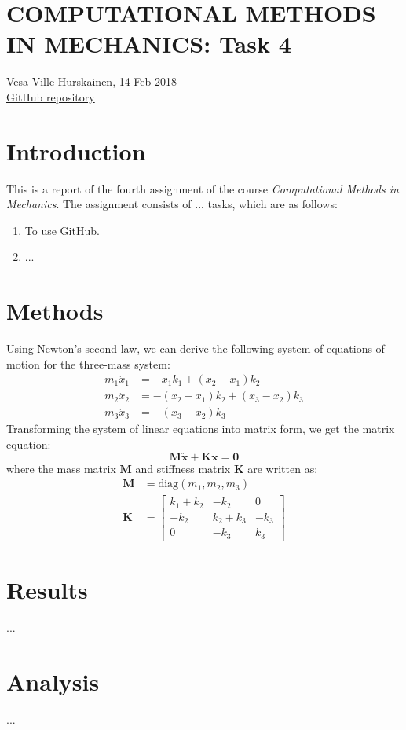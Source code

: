 \documentclass{article}
\begin{document}
	\section*{COMPUTATIONAL METHODS IN MECHANICS: Task 4}
	Vesa-Ville Hurskainen, 14 Feb 2018\\
	\href{https://github.com/VesaVilleHurskainen/cmim2018}{GitHub repository}

	\section*{Introduction}
	This is a report of the fourth assignment of the course \textit{Computational Methods in Mechanics}. The assignment consists of ... tasks, which are as follows:
	
	\begin{enumerate}
		\setlength\itemsep{0pt}
		\item To use GitHub.
		\item ...
	\end{enumerate}

	\section*{Methods}
	Using Newton's second law, we can derive the following system of equations of motion for the three-mass system: 
	\begin{equation}
		\begin{aligned}
		m_1 \ddot{x}_1 & = - x_1 k_1 + (x_2 - x_1) k_2 \\
		m_2 \ddot{x}_2 & = - (x_2 - x_1) k_2 + (x_3 - x_2) k_3\\
		m_3 \ddot{x}_3 & = - (x_3 - x_2) k_3
		\end{aligned}
	\end{equation}
	Transforming the system of linear equations into matrix form, we get the matrix equation:
	\begin{equation}
		\mathbf{M} \ddot{\bm{x}} + \mathbf{K} \bm{x} = \bm{0}
	\end{equation}
	where the mass matrix $\mathbf{M}$ and stiffness matrix $\mathbf{K}$ are written as:
	\begin{align}
		\mathbf{M} &= \text{diag}(m_1, m_2, m_3) \\
		\mathbf{K} &= \begin{bmatrix}
		k_1 + k_2 & -k_2 & 0 \\
		-k_2 & k_2 + k_3 & - k_3 \\
		0 & -k_3 & k_3
		\end{bmatrix}
	\end{align}
	
	\section*{Results}
	...

	\section*{Analysis}
	...
	
\end{document}
